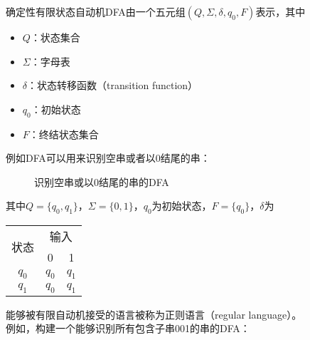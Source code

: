 确定性有限状态自动机DFA由一个五元组$ (Q, \Sigma, \delta, q_0, F) $表示，其中

\begin{itemize}
	\item $ Q $：状态集合
	\item $ \Sigma $：字母表
	\item $ \delta $：状态转移函数（transition function）
	\item $ q_0 $：初始状态
	\item $ F $：终结状态集合
\end{itemize}

\vspace{0.5cm}

例如DFA可以用来识别空串或者以0结尾的串：

\begin{figure}[H]
	\centering
	\caption{识别空串或以0结尾的串的DFA}
\end{figure}

其中$ Q = \{q_0, q_1\} $，$ \Sigma = \{0, 1\} $，$ q_0 $为初始状态，$ F = \{q_0\} $，$ \delta $为

\begin{table}[H]
	\center
	\begin{tabular}{|c|c|c|}
		\hline
		\multicolumn{1}{|c|}{\multirow{2}{*}{状态}} & \multicolumn{2}{c|}{输入}           \\ \cline{2-3}
		                                            & 0                         & 1       \\
		\hline
		$ q_0 $                                     & $ q_0 $                   & $ q_1 $ \\
		\hline
		$ q_1 $                                     & $ q_0 $                   & $ q_1 $ \\
		\hline
	\end{tabular}
\end{table}

能够被有限自动机接受的语言被称为正则语言（regular language）。\\

例如，构建一个能够识别所有包含子串001的串的DFA：

